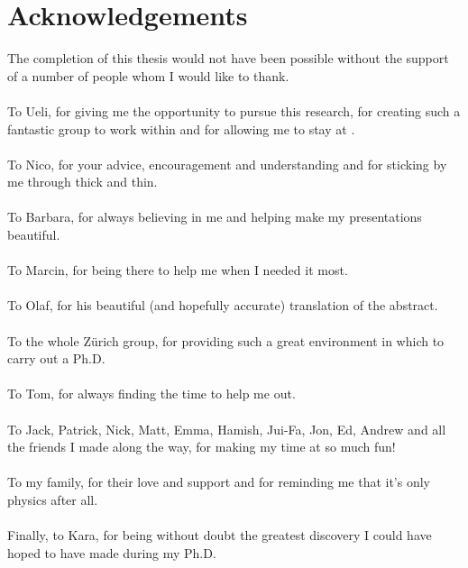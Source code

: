 \section*{Acknowledgements}

The completion of this thesis would not have been possible without the support of a number of people whom I would like to thank.\\~\\
To Ueli, for giving me the opportunity to pursue this research, for creating such a fantastic group to work within and for allowing me to stay at \cern. \\~\\
To Nico, for your advice, encouragement and understanding and for sticking by me through thick and thin. \\~\\
To Barbara, for always believing in me and helping make my presentations beautiful. \\~\\
To Marcin, for being there to help me when I needed it most. \\~\\
To Olaf, for his beautiful (and hopefully accurate) translation of the abstract. \\~\\
To the whole Z\"urich \lhcb group, for providing such a great environment in which to carry out a Ph.D. \\~\\
To Tom, for always finding the time to help me out. \\~\\
To Jack, Patrick, Nick, Matt, Emma, Hamish, Jui-Fa, Jon, Ed, Andrew and all the friends I made along the way, for making my time at \cern so much fun!  \\~\\
To my family, for their love and support and for reminding me that it's only physics after all. \\~\\
Finally, to Kara, for being without doubt the greatest discovery I could have hoped to have made during my Ph.D.

